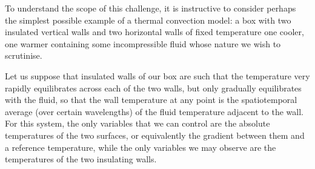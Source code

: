 \documentclass[letterpaper,10pt,english]{jupyterBook}
\begin{document}
\sphinxAtStartPar
To understand the scope of this challenge, it is instructive to consider perhaps the simplest possible example of a thermal convection model: a box with two insulated vertical walls and two horizontal walls of fixed temperature \sphinxhyphen{} one cooler, one warmer \sphinxhyphen{} containing some incompressible fluid whose nature we wish to scrutinise.

\sphinxAtStartPar
Let us suppose that insulated walls of our box are such that the temperature very rapidly equilibrates across each of the two walls, but only gradually equilibrates with the fluid, so that the wall temperature at any point is the spatiotemporal average (over certain wavelengths) of the fluid temperature adjacent to the wall. For this system, the only variables that we can control are the absolute temperatures of the two surfaces, or equivalently the gradient between them and a reference temperature, while the only variables we may observe are the temperatures of the two insulating walls.
\end{document}
